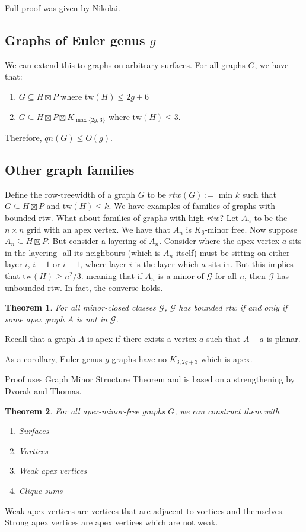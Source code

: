 \documentclass[]{article}
\newcommand{\tw}{\text{tw}}
\newtheorem{theorem}{Theorem}
\theoremstyle{definition}
\numberwithin{theorem}{section}
\numberwithin{equation}{section}
\begin{document}
Full proof was given by Nikolai.
\subsection{Graphs of Euler genus $g$}
We can extend this to graphs on arbitrary surfaces. For all graphs $G$, we have that:
\begin{enumerate}
	\item $G \subseteq H \boxtimes P$ where $\tw(H) \leq 2g + 6$
	\item $G \subseteq H \boxtimes P \boxtimes K_{\max\{2g, 3\} }$ where $\tw(H) \leq 3$. 
\end{enumerate}
Therefore, $qn(G) \leq O(g)$. 

\subsection{Other graph families}
Define the row-treewidth of a graph $G$ to be $rtw(G) := $ min $k$ such that $G \subseteq H \boxtimes P$ and $\tw(H) \leq k$. We have examples of families of graphs with bounded rtw.
What about families of graphs with high $rtw$?
Let $A_n$ to be the $n \times n$ grid with an apex vertex. We have that $A_n$ is $K_6$-minor free. Now suppose $A_n \subseteq H \boxtimes P$. But consider a layering of $A_n$. Consider where the apex vertex $a$ sits in the layering- all its neighbours (which is $A_n$ itself) must be sitting on either layer $i$, $i-1$ or $i+1$, where layer $i$ is the layer which $a$ sits in. But this implies that $\tw(H) \geq n^2/3$. meaning that if $A_n$ is a minor of $\mathcal{G}$ for all $n$, then $\mathcal{G}$ has unbounded rtw. In fact, the converse holds. 
\begin{theorem}
	For all minor-closed classes $\mathcal{G}$, $\mathcal{G}$ has bounded rtw if and only if some apex graph $A$ is not in $\mathcal{G}$.
\end{theorem}
Recall that a graph $A$ is apex if there exists a vertex $a$ such that $A - a$ is planar.

As a corollary, Euler genus $g$ graphs have no $K_{3, 2g + 3}$ which is apex. 


Proof uses Graph Minor Structure Theorem and is based on a strengthening by Dvorak and Thomas.

\begin{theorem}
	For all apex-minor-free graphs $G$, we can construct them with
	\begin{enumerate}
		\item Surfaces
		\item Vortices
		\item Weak apex vertices
		\item Clique-sums
	\end{enumerate}
\end{theorem}
Weak apex vertices are vertices that are adjacent to vortices and themselves. Strong apex vertices are apex vertices which are not weak.
\end{document}
